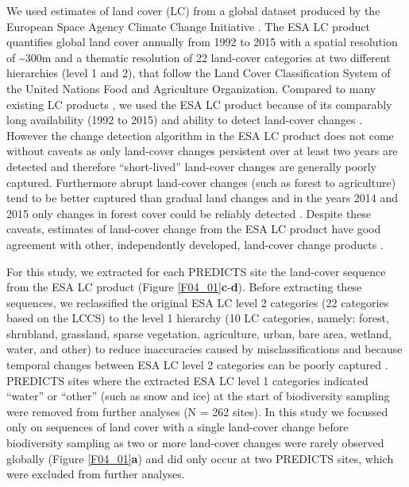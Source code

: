 We used estimates of land cover (LC) from a global dataset produced by the European Space Agency Climate Change Initiative \citep[][ver. 2.0.7 obtained from \href{http://maps.elie.ucl.ac.be/CCI}{http://maps.elie.ucl.ac.be/CCI} ]{ESA2017}. The ESA LC product quantifies global land cover annually from 1992 to 2015 with a spatial resolution of \textasciitilde 300m \citep{ESA2017} and a thematic resolution of 22 land-cover categories \citep[75.38\% global accuracy, ][]{ESA2017} at two different hierarchies (level 1 and 2), that follow the Land Cover Classification System \citep[LCCS, ][]{DiGregorio2000} of the United Nations Food and Agriculture Organization. Compared to many existing LC products \citep{Grekousis2015}, we used the ESA LC product because of its comparably long availability (1992 to 2015) and ability to detect land-cover changes \citep{ESA2017}. However the change detection algorithm in the ESA LC product does not come without caveats as only land-cover changes persistent over at least two years are detected and therefore “short-lived” land-cover changes \citep{Lambin2006} are generally poorly captured. Furthermore abrupt land-cover changes (such as forest to agriculture) tend to be better captured than gradual land changes \citep{ESA2017} and in the years 2014 and 2015 only changes in forest cover could be reliably detected \citep{ESA2017}. Despite these caveats, estimates of land-cover change from the ESA LC product have good agreement with other, independently developed, land-cover change products \citep{Li2018}.

For this study, we extracted for each PREDICTS site the land-cover sequence from the ESA LC product (Figure \ref{F04_01}\textbf{c}-\textbf{d}). Before extracting these sequences, we reclassified the original ESA LC level 2 categories (22 categories based on the LCCS) to the level 1 hierarchy (10 LC categories, namely: forest, shrubland, grassland, sparse vegetation, agriculture, urban, bare area, wetland, water, and other) to reduce inaccuracies caused by misclassifications and because temporal changes between ESA LC level 2 categories can be poorly captured \citep{ESA2017}. PREDICTS sites where the extracted ESA LC level 1 categories indicated “water” or “other” (such as snow and ice) at the start of biodiversity sampling were removed from further analyses (N = 262 sites). In this study we focussed only on sequences of land cover with a single land-cover change before biodiversity sampling as two or more land-cover changes were rarely observed globally (Figure \ref{F04_01}\textbf{a}) and did only occur at two PREDICTS sites, which were excluded from further analyses.  

